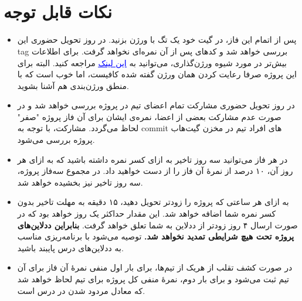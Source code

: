 \documentclass[]{article}
\begin{document}
\newpage
\pagestyle{fancy}
\fancyhf{}
\fancyfoot{}
\cfoot{\thepage}
\renewcommand{\headrulewidth}{2pt}

\KashidaOff



\tableofcontents

\newpage

 \Large \textbf{\\\\
}


\section*{{\titr نکات قابل توجه}}
\begin{itemize}
\item
پس از اتمام این فاز، در گیت خود یک تگ با ورژن  بزنید. در روز تحویل حضوری این tag بررسی خواهد شد و کدهای پس از آن نمره‌ای نخواهد گرفت. برای اطلاعات بیش‌تر در مورد شیوه ورژن‌گذاری، می‌توانید به
 \href{https://semver.org/}{\textcolor{blue}{\underline{این لینک}}}
 مراجعه کنید. البته برای این پروژه صرفا رعایت کردن همان ورژن گفته شده کافیست، اما خوب‌ است که با منطق ورژن‌بندی هم آشنا بشوید.

\item
در روز تحویل حضوری مشارکت تمام اعضای تیم در پروژه بررسی خواهد‌ شد و در صورت عدم مشارکت بعضی از اعضا، نمره‌ی ایشان برای آن فاز پروژه "صفر" لحاظ می‌گردد. مشارکت، با توجه به commit های افراد تیم در مخزن گیت‌هاب پروژه بررسی می‌شود.

\item
در هر فاز می‌توانید سه روز تاخیر به ازای کسر نمره داشته‌ باشید که به ازای هر روز آن، ۱۰ درصد از نمرهٔ آن فاز را از دست خواهید‌ داد. در مجموع سه‌فاز پروژه، سه روز تاخیر نیز بخشیده خواهد‌ شد.

\item
به ازای هر ساعتی که پروژه را زودتر تحویل دهید، ۱۵ دقیقه به مهلت تاخیر بدون کسر نمره شما اضافه خواهد‌ شد. این مقدار حداکثر یک روز خواهد‌ بود که در صورت ارسال ۴ روز زودتر از ددلاین به شما تعلق خواهد گرفت. \textbf{بنابراین ددلاین‌های پروژه تحت هیچ شرایطی تمدید نخواهد‌ شد.} توصیه می‌شود با برنامه‌ریزی مناسب به ددلاین‌های درس پایبند باشید.

\item
در صورت کشف تقلب از هریک از تیم‌ها، برای بار اول منفی نمرهٔ آن فاز برای آن تیم ثبت می‌شود و برای بار دوم، نمرهٔ منفی کل پروژه برای تیم لحاظ خواهد‌ شد که معادل مردود شدن در درس است.


\end{itemize}
\end{document}
